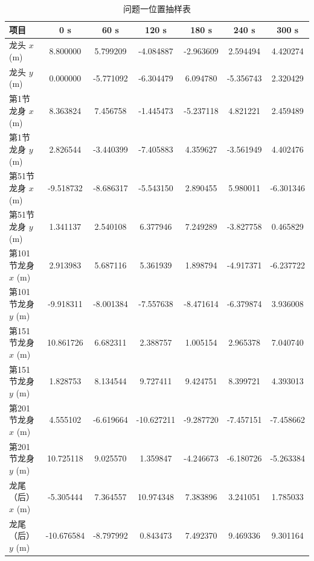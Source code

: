 \begin{table}[H]
\centering
\caption{问题一位置抽样表}
\label{tab:q1-position}
\begingroup
\small
\setlength{\tabcolsep}{2pt}
\begin{tabularx}{\textwidth}{lCCCCCC}
\toprule
项目 & 0 s & 60 s & 120 s & 180 s & 240 s & 300 s\\
\midrule
龙头 $x$ (m) & 8.800000 & 5.799209 & -4.084887 & -2.963609 & 2.594494 & 4.420274\\
龙头 $y$ (m) & 0.000000 & -5.771092 & -6.304479 & 6.094780 & -5.356743 & 2.320429\\
第1节龙身 $x$ (m) & 8.363824 & 7.456758 & -1.445473 & -5.237118 & 4.821221 & 2.459489\\
第1节龙身 $y$ (m) & 2.826544 & -3.440399 & -7.405883 & 4.359627 & -3.561949 & 4.402476\\
第51节龙身 $x$ (m) & -9.518732 & -8.686317 & -5.543150 & 2.890455 & 5.980011 & -6.301346\\
第51节龙身 $y$ (m) & 1.341137 & 2.540108 & 6.377946 & 7.249289 & -3.827758 & 0.465829\\
第101节龙身 $x$ (m) & 2.913983 & 5.687116 & 5.361939 & 1.898794 & -4.917371 & -6.237722\\
第101节龙身 $y$ (m) & -9.918311 & -8.001384 & -7.557638 & -8.471614 & -6.379874 & 3.936008\\
第151节龙身 $x$ (m) & 10.861726 & 6.682311 & 2.388757 & 1.005154 & 2.965378 & 7.040740\\
第151节龙身 $y$ (m) & 1.828753 & 8.134544 & 9.727411 & 9.424751 & 8.399721 & 4.393013\\
第201节龙身 $x$ (m) & 4.555102 & -6.619664 & -10.627211 & -9.287720 & -7.457151 & -7.458662\\
第201节龙身 $y$ (m) & 10.725118 & 9.025570 & 1.359847 & -4.246673 & -6.180726 & -5.263384\\
龙尾（后） $x$ (m) & -5.305444 & 7.364557 & 10.974348 & 7.383896 & 3.241051 & 1.785033\\
龙尾（后） $y$ (m) & -10.676584 & -8.797992 & 0.843473 & 7.492370 & 9.469336 & 9.301164\\
\bottomrule
\end{tabularx}
\endgroup
\end{table}

